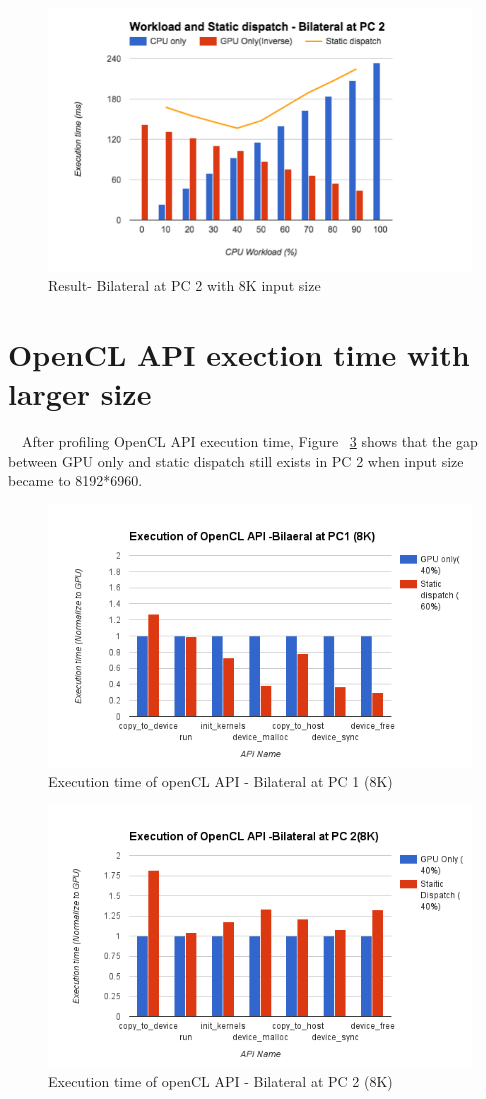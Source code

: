 \begin{figure}[!hbtp]
\centering
\includegraphics[width=12cm]{img/WorkloadAndStaiticDispatch-BilateralAtPC2(8K).png}
\caption{Result- Bilateral at PC 2 with 8K input size}
\label{fig:my_label}
\end{figure}


\section{OpenCL API exection time with larger size}
\quad \  \ After profiling OpenCL API execution time, Figure ~\ref{fig:ExeTime8KPC2} shows that the gap between GPU only and static dispatch still exists in PC 2 when input size became to 8192*6960.

\begin{figure}[!hbtp]
\centering
\includegraphics[width=12cm]{img/ExecutionofOpenCLAPI-BilateralatPC1(8K).png}
\caption{Execution time of openCL API - Bilateral at PC 1 (8K)}
\label{fig:ExeTime8KPC1}
\end{figure}

\begin{figure}[!hbtp]
\centering
\includegraphics[width=12cm]{img/ExecutionofOpenCLAPI-BilateralatPC2(8K).png}
\caption{Execution time of openCL API - Bilateral at PC 2 (8K)}
\label{fig:ExeTime8KPC2}
\end{figure}



